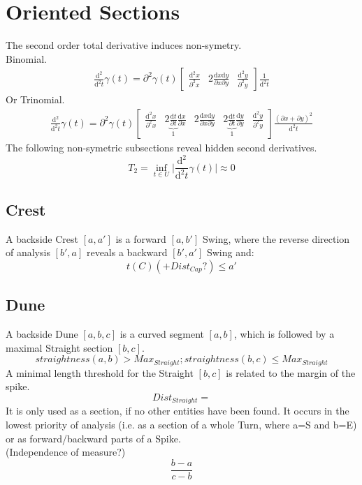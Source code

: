 \documentclass{report}
\begin{document}
\section{Oriented Sections}
The second order total derivative induces non-symetry.\\
Binomial.
\begin{align}
\frac{\mathrm{d}^2}{\mathrm{d}^2t}\gamma(t)=\partial^2 \gamma(t) \begin{bmatrix} \frac{\mathrm{d}^2x}{\partial^2 x} & 2 \frac{\mathrm{d}x\mathrm{d}y}{\partial x \partial y} & \frac{\mathrm{d}^2y}{\partial^2 y}\end{bmatrix}\frac{1}{\mathrm{d}^2t}
\end{align}
Or Trinomial.
\begin{align}
\frac{\mathrm{d}^2}{\mathrm{d}^2t}\gamma(t)=\partial^2 \gamma (t) \begin{bmatrix}\frac{\mathrm{d}^2 x}{\partial^2 x} & 2 \underbrace{\frac{\mathrm{d}t}{\partial t}}_{1} \frac{\mathrm{d}x}{\partial x} & 2 \frac{\mathrm{d}x\mathrm{d}y}{\partial x \partial y} & 2 \underbrace{\frac{\mathrm{d}t}{\partial t}}_{1} \frac{\mathrm{d}y}{\partial y} & \frac{\mathrm{d}^2 y}{\partial^2 y}\end{bmatrix}\frac{(\partial x + \partial y)^2}{\mathrm{d}^2 t}
\end{align}
The following non-symetric subsections reveal hidden second derivatives.
\begin{equation}
T_{2} = \inf_{t \in U} \lvert \frac{\mathrm{d}^2}{\mathrm{d}^2t}\gamma(t) \rvert \approx 0
\end{equation}

\subsection{Crest}
A backside Crest $[a,a']$ is a forward $[a,b']$ Swing, where the reverse direction of analysis $[b',a]$ reveals a backward $[b',a']$ Swing  and:
\begin{equation}
t(C)(+Dist_{Cap}?)\leq a'
\end{equation}

\subsection{Dune}
A backside Dune $[a,b,c]$ is a curved segment $[a,b]$, which is followed by a maximal Straight section $[b,c]$.
\begin{equation}
straightness(a,b)>Max_{Straight};straightness(b,c)\leq Max_{Straight}
\end{equation}
A minimal length threshold for the Straight $[b,c]$ is related to the margin of the spike.
\begin{equation}
Dist_{Straight}=
\end{equation}
It is only used as a section, if no other entities have been found. It occurs in the lowest priority of analysis (i.e. as a section of a whole Turn, where a=S and b=E) or as forward/backward parts of a Spike.\\
(Independence of measure?)
\begin{equation}
\frac{b-a}{c-b}
\end{equation}
\end{document}
